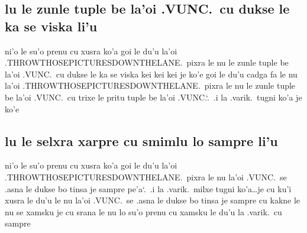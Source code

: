 \documentclass{report}
\newcommand\sds{\spacefactor\sfcode`.\ \space}
\begin{document}
\subsection{lu le zunle tuple be la'oi .VUNC.\ cu dukse le ka se viska li'u}
ni'o le su'o prenu cu xusra ko'a goi le du'u la'oi .THROWTHOSEPICTURESDOWNTHELANE.\ pixra le nu le zunle tuple be la'oi .VUNC.\ cu dukse le ka se viska kei kei kei je ko'e goi le du'u cadga fa le nu la'oi .THROWTHOSEPICTURESDOWNTHELANE.\ pixra le nu le zunle tuple be la'oi .VUNC.\ cu trixe le pritu tuple be la'oi .VUNC.\sds  .i la .varik.\ tugni ko'a je ko'e

\subsection{lu le selxra xarpre cu smimlu lo sampre li'u}
ni'o le su'o prenu cu xusra ko'a goi le du'u la'oi .THROWTHOSEPICTURESDOWNTHELANE.\ pixra le nu la'oi .VUNC.\ se .asna le dukse bo tinsa je sampre pe'a\sds  .i la .varik.\ milxe tugni ko'a\ldots je cu ku'i xusra le du'u le nu la'oi .VUNC.\ se .asna le dukse bo tinsa je sampre cu kakne le nu se xamsku je cu srana le nu lo su'o prenu cu xamsku le du'u la .varik.\ cu sampre
\end{document}
